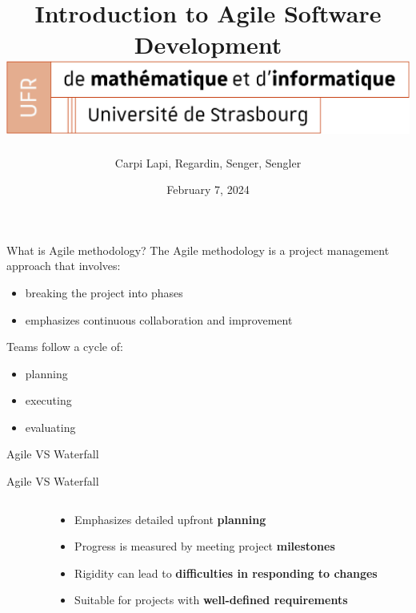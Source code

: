 \documentclass[10pt]{beamer}
\title[Introduction to Agile Software Development]{
  Introduction to Agile Software Development \\
  \vspace{1cm}
  \includegraphics[width=0.6\pdfpagewidth]{images/logo_Uni.png}
}
\author[SuperAgile]{Carpi Lapi, Regardin, Senger, Sengler}
\date[February 7, 2024]{February 7, 2024}
\begin{document}
\frame{\titlepage}

\begin{frame}{What is Agile methodology?}
The Agile methodology is a project management approach that involves:
\begin{itemize}
    \item breaking the project into phases
    \item emphasizes continuous collaboration and improvement \\
    \vspace{1cm}
\end{itemize}

Teams follow a cycle of: 
\begin{itemize}
    \item planning
    \item executing
    \item evaluating
\end{itemize}

\end{frame}


\begin{frame}{Agile VS Waterfall}
  \vspace{0.5cm}
\end{frame}

\begin{frame}{Agile VS Waterfall}
  \vspace{0.5cm}
  \begin{columns}[T]
    \begin{column}{0.5\textwidth}
    \end{column}

    \begin{column}{0.5\textwidth}
      \vspace{2cm}
      \begin{itemize}
        \item<2-> Emphasizes detailed upfront \textbf{planning}
        \item<3-> Progress is measured by meeting project \textbf{milestones}
        \item<4-> Rigidity can lead to \textbf{difficulties in responding to changes}
        \item<5-> Suitable for projects with \textbf{well-defined requirements}
      \end{itemize}
    \end{column}
  \end{columns}
\end{frame}
\end{document}
